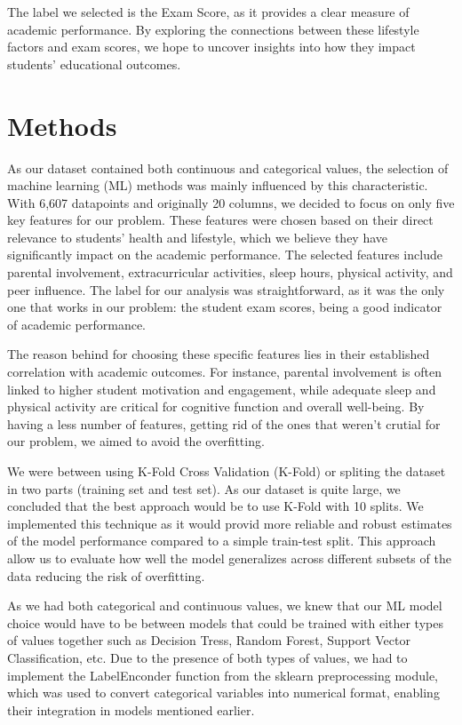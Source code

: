 \documentclass{article}
\begin{document}
The label we selected is the Exam Score, as it provides a clear measure of academic performance. By exploring the connections between these lifestyle factors and exam scores, we hope to uncover insights into how they impact students’ educational outcomes.

\section{Methods}

\quad As our dataset contained both continuous and categorical values, the selection of machine learning (ML) methods was mainly influenced by this characteristic. With 6,607 datapoints and originally 20 columns, we decided to focus on only five key features for our problem. These features were chosen based on their direct relevance to students' health and lifestyle, which we believe they have significantly impact on the academic performance. The selected features include parental involvement, extracurricular activities, sleep hours, physical activity, and peer influence. The label for our analysis was straightforward, as it was the only one that works in our problem: the student exam scores, being a good indicator of academic performance.

The reason behind for choosing these specific features lies in their established correlation with academic outcomes. For instance, parental involvement is often linked to higher student motivation and engagement, while adequate sleep and physical activity are critical for cognitive function and overall well-being. By having a less number of features, getting rid of the ones that weren’t crutial for our problem, we aimed to avoid the overfitting. 

We were between using K-Fold Cross Validation (K-Fold) or spliting the dataset in two parts (training set and test set). As our dataset is quite large, we concluded that the best approach  would be to use K-Fold with 10 splits. We implemented this technique as it would provid more reliable and robust estimates of the model performance compared to a simple train-test split. This approach allow us to evaluate how well the model generalizes across different subsets of the data reducing the risk of overfitting. 

As we had both categorical and continuous values, we knew that our ML model choice would have to be between models that could be trained with either types of values together such as Decision Tress, Random Forest, Support Vector Classification, etc. Due to the presence of both types of values, we had to implement the LabelEnconder function from the sklearn preprocessing module, which was used to convert categorical variables into numerical format, enabling their integration in models mentioned earlier.
\end{document}
